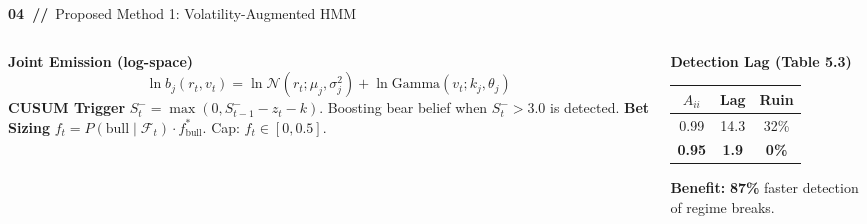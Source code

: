 \documentclass[11pt,aspectratio=169]{beamer}
\newcommand{\Normal}{\mathcal{N}}
\newcommand{\ca}[1]{\textcolor{bbamber}{\textbf{#1}}}
\newcommand{\cg}[1]{\textcolor{bbgreen}{\textbf{#1}}}
\begin{document}
\begin{frame}{\cg{04~//}~Proposed Method 1: Volatility-Augmented HMM}
  \begin{columns}[T]
    \begin{column}{0.55\textwidth}
      \ca{Joint Emission (log-space)}
      {\footnotesize
      \[\ln b_j(r_t,v_t)=\ln\Normal(r_t;\mu_j,\sigma_j^2)
        +\ln\mathrm{Gamma}(v_t;k_j,\theta_j)\]
      }
      \ca{CUSUM Trigger}
      {\small $S_t^-=\max(0, S_{t-1}^- - z_t - k)$. Boosting bear belief when $S_t^- > 3.0$ is detected.}
      \vspace{0.6em}
      \ca{Bet Sizing}
      {\small $f_t = P(\text{bull} \mid \mathcal{F}_t)\cdot f^*_\text{bull}$. Cap: $f_t\in[0, 0.5]$.}
    \end{column}
    \begin{column}{0.4\textwidth}
      \ca{Detection Lag (Table 5.3)}
      \begin{center}
      \small
      \begin{tabular}{ccc}
        \toprule
        $A_{ii}$ & Lag & Ruin \\
        \midrule
        0.99 & 14.3 & 32\% \\
        \cg{0.95} & \cg{1.9} & \cg{0\%} \\
        \bottomrule
      \end{tabular}
      \end{center}
      \vspace{0.4em}
      \ca{Benefit:} \cg{87\%} faster detection of regime breaks.
    \end{column}
  \end{columns}
\end{frame}
\end{document}
